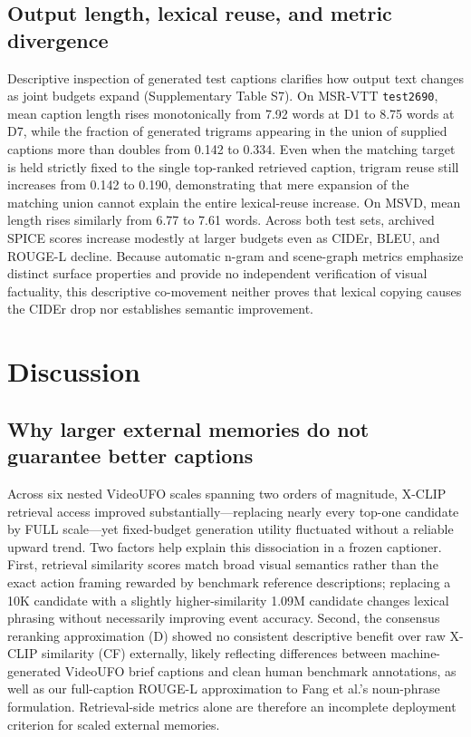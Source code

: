 \documentclass[11pt,a4paper]{article}
\begin{document}
\subsection{Output length, lexical reuse, and metric divergence}
Descriptive inspection of generated test captions clarifies how output text changes as joint budgets expand (Supplementary Table S7). On MSR-VTT \texttt{test2690}, mean caption length rises monotonically from 7.92 words at D1 to 8.75 words at D7, while the fraction of generated trigrams appearing in the union of supplied captions more than doubles from 0.142 to 0.334. Even when the matching target is held strictly fixed to the single top-ranked retrieved caption, trigram reuse still increases from 0.142 to 0.190, demonstrating that mere expansion of the matching union cannot explain the entire lexical-reuse increase. On MSVD, mean length rises similarly from 6.77 to 7.61 words. Across both test sets, archived SPICE scores increase modestly at larger budgets even as CIDEr, BLEU, and ROUGE-L decline. Because automatic n-gram and scene-graph metrics emphasize distinct surface properties and provide no independent verification of visual factuality, this descriptive co-movement neither proves that lexical copying causes the CIDEr drop nor establishes semantic improvement.

\section{Discussion}
\subsection{Why larger external memories do not guarantee better captions}
Across six nested VideoUFO scales spanning two orders of magnitude, X-CLIP retrieval access improved substantially---replacing nearly every top-one candidate by FULL scale---yet fixed-budget generation utility fluctuated without a reliable upward trend. Two factors help explain this dissociation in a frozen captioner. First, retrieval similarity scores match broad visual semantics rather than the exact action framing rewarded by benchmark reference descriptions; replacing a 10K candidate with a slightly higher-similarity 1.09M candidate changes lexical phrasing without necessarily improving event accuracy. Second, the consensus reranking approximation (D) showed no consistent descriptive benefit over raw X-CLIP similarity (CF) externally, likely reflecting differences between machine-generated VideoUFO brief captions and clean human benchmark annotations, as well as our full-caption ROUGE-L approximation to Fang et al.'s noun-phrase formulation. Retrieval-side metrics alone are therefore an incomplete deployment criterion for scaled external memories.
\end{document}
